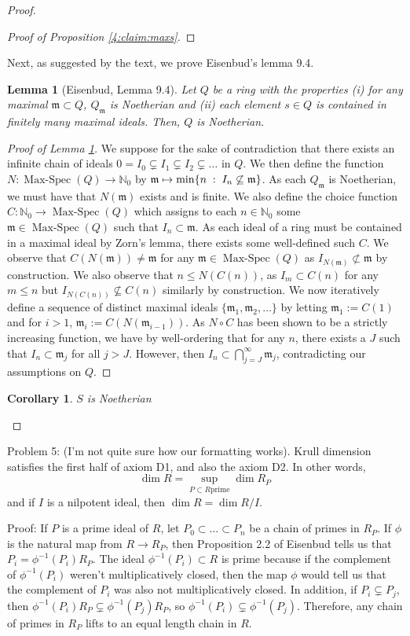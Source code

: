 \documentclass[Letter,12pt]{article}
\newcommand{\n}{\mathbb{N}}
\newcommand{\mfr}{\mathfrak{m}}
\newcommand{\<}{\left\langle}
\renewcommand{\>}{\right\rangle}
\DeclareMathOperator{\mspec}{Max-Spec}
\newenvironment{subproof}[1][\proofname]{%
	\renewcommand{\qedsymbol}{$\blacksquare$}%
	\begin{proof}[#1]%
	}{%
	\end{proof}%
}
\newtheorem{cor}[theorem]{Corollary}
\newtheorem{lemma}[theorem]{Lemma}
\theoremstyle{definition}
\begin{document}
\begin{proof}
\begin{subproof}[Proof of Proposition \ref{4:claim:maxs}]
		\end{subproof}
		Next, as suggested by the text, we prove Eisenbud's lemma 9.4.
		\begin{lemma}[Eisenbud, Lemma 9.4]\label{4:lem:9.4}
			Let $Q$ be a ring with the properties (i) for any maximal $\mfr\subset Q$, $Q_\mfr$ is Noetherian and (ii) each element $s\in Q$ is contained in finitely many maximal ideals. Then, $Q$ is Noetherian.
		\end{lemma}
		\begin{subproof}[Proof of Lemma \ref{4:lem:9.4}]
			We suppose for the sake of contradiction that there exists an infinite chain of ideals $0=I_0\subsetneq I_1\subsetneq I_2\subsetneq\ldots$ in $Q$. We then define the function $N:\mspec(Q)\to \n_0$ by $\mfr\mapsto \min\{n\;:\; I_n\centernot \subseteq\mfr\}$. As each $Q_\mfr$ is Noetherian, we must have that $N(\mfr)$ exists and is finite. We also define the choice function $C:\n_0\to \mspec(Q)$ which assigns to each $n\in \n_0$ some $\mfr\in \mspec(Q)$ such that $I_n\subset \mfr$. As each ideal of a ring must be contained in a maximal ideal by Zorn's lemma, there exists some well-defined such $C$. We observe that $C(N(\mfr))\neq \mfr$ for any $\mfr\in \mspec(Q)$ as $I_{N(\mfr)}\not \subset \mfr$ by construction. We also observe that $n\leq N(C(n))$, as $I_m\subset C(n)$ for any $m\leq n$ but $I_{N(C(n))}\not\subseteq C(n)$ similarly by construction. We now iteratively define a sequence of distinct maximal ideals $\{\mfr_1,\mfr_2,\hdots\}$ by letting $\mfr_1:=C(1)$ and for $i>1$, $\mfr_i:=C(N(\mfr_{i-1}))$. As $N\circ C$ has been shown to be a strictly increasing function, we have by well-ordering that for any $n$, there exists a $J$ such that $I_n\subset \mfr_j$ for all $j>J$. However, then $I_n\subset \bigcap_{j=J}^\infty \mfr_j$, contradicting our assumptions on $Q$.  
		\end{subproof}
		\begin{cor}
			$S$ is Noetherian
		\end{cor}
	\end{proof}
	
	
	Problem 5: (I'm not quite sure how our formatting works).
	Krull dimension satisfies the first half of axiom D1, and also the axiom D2. In other words, \[\dim R = \sup_{P\subset R \text{prime}} \dim R_P\] and if $I$ is a nilpotent ideal, then $\dim R = \dim R/I$.
	
	Proof: If $P$ is a prime ideal of $R$, let $P_0\subset\ldots\subset P_n$ be a chain of primes in $R_P$. If $\phi$ is the natural map from $R\to R_P$, then Proposition 2.2 of Eisenbud tells us that $P_i = \phi^{-1}(P_i)R_P$. The ideal $\phi^{-1}(P_i)\subset R$ is prime because if the complement of $\phi^{-1}(P_i)$ weren't multiplicatively closed, then the map $\phi$ would tell us that the complement of $P_i$ was also not multiplicatively closed. In addition, if $P_i\subsetneq P_j$, then $\phi^{-1}(P_i)R_P \subsetneq \phi^{-1}(P_j)R_P$, so $\phi^{-1}(P_i)\subsetneq \phi^{-1}(P_j)$. Therefore, any chain of primes in $R_P$ lifts to an equal length chain in $R$.
	
\end{document}
